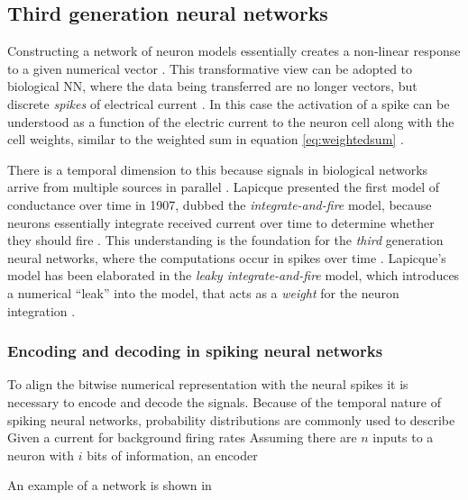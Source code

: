 \documentclass[report.tex]{subfiles}
\begin{document}
\subsection{Third generation neural networks}
Constructing a network of neuron models essentially creates a non-linear
response to a given numerical vector \cite{Russel2007}.
This transformative view can be adopted to biological \gls{NN}, where
the data being transferred are no longer vectors, but discrete
\textit{spikes} of electrical current \cite[p. 32]{Dayan2001, Eliasmith2004}.
In this case the activation of a spike can be understood as a function
of the electric current to the neuron cell along with the cell weights,
similar to the weighted sum in equation \ref{eq:weightedsum}
\cite[p. 234]{Dayan2001}.

There is a temporal dimension to this because signals in biological 
networks arrive from multiple sources in parallel \cite{Eliasmith2004}.
Lapicque presented the first model of conductance over time in 1907,
dubbed the \textit{integrate-and-fire} model, because neurons essentially
integrate received current over time to determine whether they should fire 
\cite{Dayan2001, Eliasmith2004}.
This understanding is the foundation for the \textit{third} generation
neural networks, where the computations occur in spikes over time 
\cite{Maass1997}.
Lapicque's model has been elaborated in the \textit{leaky
integrate-and-fire} model, which introduces a numerical ``leak''
into the model, that acts as a \textit{weight} for the neuron integration
\cite{Eliasmith2004, Eliasmith2015}.

\subsubsection{Encoding and decoding in spiking neural networks}
To align the bitwise numerical representation with the neural spikes
it is necessary to encode and decode the signals.
Because of the temporal nature of spiking neural networks, probability
distributions are commonly used to describe 
Given a current for background firing rates
Assuming there are $n$ inputs to a neuron with $i$ bits of information,
an encoder


An example of a network is shown in 
\end{document}
